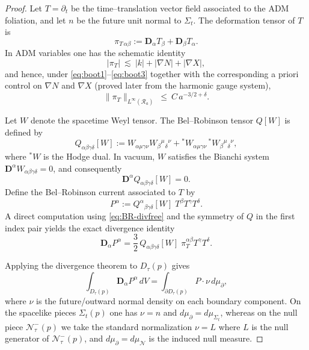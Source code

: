 \documentclass{amsart}
\begin{document}
{\begin{proof}
\medskip

\noindent
Let $T=\partial_{t}$ be the time--translation vector field associated to the ADM foliation, and let $n$ be the
future unit normal to $\Sigma_{t}$.  The deformation tensor of $T$ is
\[
\pi_{T\,\alpha\beta}:=\mathbf{D}_{\alpha}T_{\beta}+\mathbf{D}_{\beta}T_{\alpha}.
\]
In ADM variables one has the schematic identity
\begin{equation}
\label{eq:def-tensor-est}
|\pi_{T}|\ \lesssim\ |k|+|\nabla N|+|\nabla X|,
\end{equation}
and hence, under \eqref{eq:boot1}--\eqref{eq:boot3} together with the corresponding a priori control on
$\nabla N$ and $\nabla X$ (proved later from the harmonic gauge system),
\begin{equation}
\label{eq:piT-bootstrap}
\|\pi_{T}\|_{L^{\infty}(\mathcal{R}_{a})}\ \le\ C\,a^{-3/2+\delta}.
\end{equation}

\medskip

\noindent
Let $W$ denote the spacetime Weyl tensor.  The Bel--Robinson tensor $Q[W]$ is defined by
\[
Q_{\alpha\beta\gamma\delta}[W]
:=
W_{\alpha\mu\gamma\nu}W_{\beta}{}^{\mu}{}_{\delta}{}^{\nu}
+{}^{\ast}W_{\alpha\mu\gamma\nu}\,{}^{\ast}W_{\beta}{}^{\mu}{}_{\delta}{}^{\nu},
\]
where ${}^{\ast}W$ is the Hodge dual.  In vacuum, $W$ satisfies the Bianchi system
$\mathbf{D}^{\alpha}W_{\alpha\beta\gamma\delta}=0$, and consequently
\begin{equation}
\label{eq:BR-divfree}
\mathbf{D}^{\alpha}Q_{\alpha\beta\gamma\delta}[W]=0.
\end{equation}
Define the Bel--Robinson current associated to $T$ by
\[
P^{\alpha}:=Q^{\alpha}{}_{\beta\gamma\delta}[W]\;T^{\beta}T^{\gamma}T^{\delta}.
\]
A direct computation using \eqref{eq:BR-divfree} and the symmetry of $Q$ in the first index pair yields the exact
divergence identity
\begin{equation}
\label{eq:divP}
\mathbf{D}_{\alpha}P^{\alpha}
=
\frac{3}{2}\,Q_{\alpha\beta\gamma\delta}[W]\;\pi_{T}^{\alpha\beta}T^{\gamma}T^{\delta}.
\end{equation}

\medskip

\noindent
Applying the divergence theorem to $D_{\tau}(p)$ gives
\begin{equation}
\label{eq:stokes}
\int_{D_{\tau}(p)}\mathbf{D}_{\alpha}P^{\alpha}\,dV
=
\int_{\partial D_{\tau}(p)} P\cdot \nu \,d\mu_{\partial},
\end{equation}
where $\nu$ is the future/outward normal density on each boundary component.  On the spacelike pieces
$\Sigma_{t}(p)$ one has $\nu=n$ and $d\mu_{\partial}=d\mu_{\Sigma_{t}}$, whereas on the null piece
$\mathcal{N}^{-}_{\tau}(p)$ we take the standard normalization $\nu=L$ where $L$ is the null generator of
$\mathcal{N}^{-}_{\tau}(p)$, and $d\mu_{\partial}=d\mu_{\mathcal{N}}$ is the induced null measure.


\end{proof}}
\end{document}
